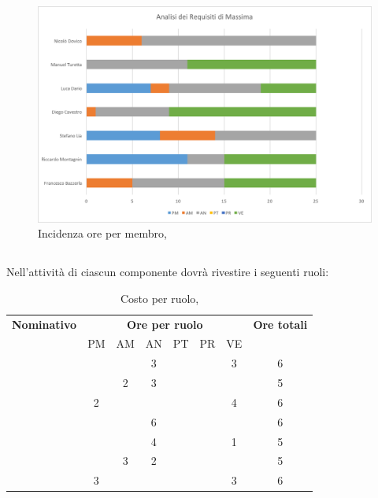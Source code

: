 \begin{figure}[H]
	\centering 
	\includegraphics[scale=0.7]{Immagini/GraficiPianoLavoro/ARM.png}
	\caption{Incidenza ore per membro, \ARM}
\end{figure}

\newpage
\subsection{\ARD}
Nell'attività di \ARD ciascun componente dovrà rivestire i seguenti ruoli:

\begin{table}[h]
	\begin{center}
		\begin{tabular}{|c|c|c|c|c|c|c|c|}
			\hline
			\textbf{Nominativo} & \multicolumn{6}{c|}{\textbf{Ore per ruolo}} & \textbf{Ore totali} \\
					& PM & AM & AN & PT & PR & VE & \\
			\hline
			\FB		& 	 &	  &	3  &	&	 & 3  &	6 \\
			\hline
			\RM		&	 & 2  &	3  &	&	 &	  &	5	\\
			\hline
			\SL		& 2	 &	  &	   &	&	 & 4  &	6	\\
			\hline
			\DC		&	 &	  &	6  &	&	 & 	  &	6	\\
			\hline
			\LD 	&	 &	  &	4  &	&	 & 1  &	5	\\
			\hline
			\MT		& 	 & 3  &	2  &	&	 &	  &	5	\\
			\hline
			\ND 	& 3	 &	  &	   &	&	 & 3  &	6	\\
			\hline
		\end{tabular}
	\end{center}
	\caption{Costo per ruolo, \ARD}
\end{table}


